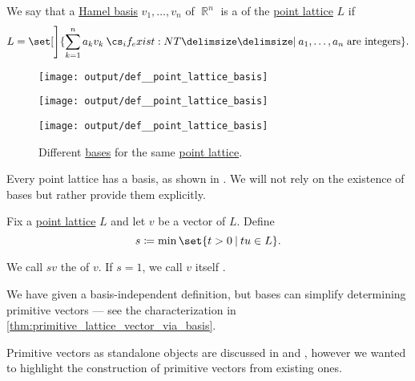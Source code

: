 \begin{definition}\label{def:point_lattice_basis}
  We say that a \hyperref[def:hamel_basis]{Hamel basis} \( v_1, \ldots, v_n \) of \( \BbbR^n \) is a  of the \hyperref[def:point_lattice]{point lattice} \( L \) if
  \begin{equation}\label{eq:def:point_lattice_basis}
    L = \set[\Bigg]{ \sum_{k=1}^n a_k v_k \given* a_1, \ldots, a_n \T{are integers} }.
  \end{equation}

  \begin{figure}[!ht]
    \begin{subcaptionblock}{0.3\textwidth}
      \centering
      \texttt{[image: output/def\_\_point\_lattice\_basis]}
    \end{subcaptionblock}
    \hfill
    \begin{subcaptionblock}{0.3\textwidth}
      \centering
      \texttt{[image: output/def\_\_point\_lattice\_basis]}
    \end{subcaptionblock}
    \hfill
    \begin{subcaptionblock}{0.3\textwidth}
      \centering
      \texttt{[image: output/def\_\_point\_lattice\_basis]}
    \end{subcaptionblock}
    \caption{Different \hyperref[def:point_lattice_basis]{bases} for the same \hyperref[def:point_lattice]{point lattice}.}\label{fig:def:point_lattice_basis}
  \end{figure}
\end{definition}
\begin{comments}
  \item Every point lattice has a basis, as shown in \cite[thm. 21.2(ii)]{Gruber2007ConvexAndDiscreteGeometry}. We will not rely on the existence of bases but rather provide them explicitly.
\end{comments}

\begin{definition}\label{def:primitive_lattice_vector}\mimprovised
  Fix a \hyperref[def:point_lattice]{point lattice} \( L \) and let \( v \) be a vector of \( L \). Define
  \begin{equation*}
    s \coloneqq \min\set{ t > 0 \given tu \in L }.
  \end{equation*}

  We call \( sv \) the  of \( v \). If \( s = 1 \), we call \( v \) itself .
\end{definition}
\begin{comments}
  \item We have given a basis-independent definition, but bases can simplify determining primitive vectors --- see the characterization in \cref{thm:primitive_lattice_vector_via_basis}.
  \item Primitive vectors as standalone objects are discussed in  and , however we wanted to highlight the construction of primitive vectors from existing ones.
\end{comments}

